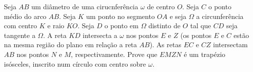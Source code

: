 Seja $AB$ um diâmetro de uma cirucnferência $\omega$ de centro $O$. Seja $C$ o ponto médio do arco $AB$. Seja $K$ um ponto no segmento $OA$ e seja $\Omega$ a circunferência com centro $K$ e raio $KO$. Seja $D$ o ponto em $\Omega$ distinto de $O$ tal que $CD$ seja tangente a $\Omega$. A reta $KD$ intersecta a $\omega$ nos pontos $E$ e $Z$ (os pontos $E$ e $C$ estão na mesma região do plano em relação a reta $AB$). As retas $EC$ e $CZ$ intersectam $AB$ nos pontos $N$ e $M$, respectivamente. Prove que $EMZN$ é um trapézio isósceles, inscrito num círculo com centro sobre $\omega$.
